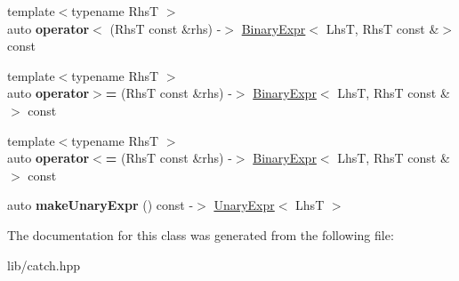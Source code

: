 \begin{DoxyCompactItemize}
\item 
\mbox{\label{class_catch_1_1_expr_lhs_a55284221df2edb3542e765c87b5691b9}} 
{\footnotesize template$<$typename RhsT $>$ }\\auto {\bfseries operator$<$} (RhsT const \&rhs) -\/$>$ \mbox{\hyperlink{class_catch_1_1_binary_expr}{Binary\+Expr}}$<$ LhsT, RhsT const \&$>$ const
\item 
\mbox{\label{class_catch_1_1_expr_lhs_aff594ae5b957105c517a6257d2e730f0}} 
{\footnotesize template$<$typename RhsT $>$ }\\auto {\bfseries operator$>$=} (RhsT const \&rhs) -\/$>$ \mbox{\hyperlink{class_catch_1_1_binary_expr}{Binary\+Expr}}$<$ LhsT, RhsT const \&$>$ const
\item 
\mbox{\label{class_catch_1_1_expr_lhs_a6bd8a22c1a7fe2f66d71d7196f20af4f}} 
{\footnotesize template$<$typename RhsT $>$ }\\auto {\bfseries operator$<$=} (RhsT const \&rhs) -\/$>$ \mbox{\hyperlink{class_catch_1_1_binary_expr}{Binary\+Expr}}$<$ LhsT, RhsT const \&$>$ const
\item 
\mbox{\label{class_catch_1_1_expr_lhs_ab68bd6d5d3ae21b7fba9010150fba95d}} 
auto {\bfseries make\+Unary\+Expr} () const -\/$>$ \mbox{\hyperlink{class_catch_1_1_unary_expr}{Unary\+Expr}}$<$ LhsT $>$
\end{DoxyCompactItemize}


The documentation for this class was generated from the following file\+:\begin{DoxyCompactItemize}
\item 
lib/catch.\+hpp\end{DoxyCompactItemize}

